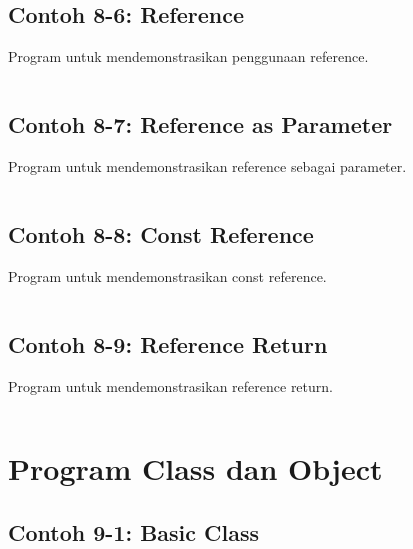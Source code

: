 \subsection{Contoh 8-6: Reference}

Program untuk mendemonstrasikan penggunaan reference.

\begin{lstlisting}[language=c++, caption=Reference]

\end{lstlisting}

\subsection{Contoh 8-7: Reference as Parameter}

Program untuk mendemonstrasikan reference sebagai parameter.

\begin{lstlisting}[language=c++, caption=Reference as Parameter]

\end{lstlisting}

\subsection{Contoh 8-8: Const Reference}

Program untuk mendemonstrasikan const reference.

\begin{lstlisting}[language=c++, caption=Const Reference]

\end{lstlisting}

\subsection{Contoh 8-9: Reference Return}

Program untuk mendemonstrasikan reference return.

\begin{lstlisting}[language=c++, caption=Reference Return]

\end{lstlisting}

\section{Program Class dan Object}

\subsection{Contoh 9-1: Basic Class}


